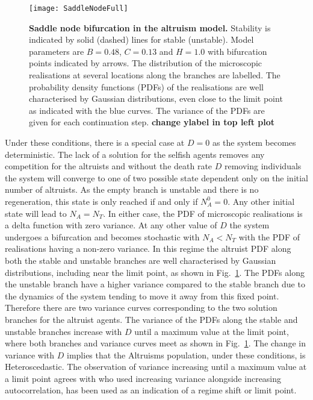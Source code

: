 \documentclass[11pt]{article}
\begin{document}
\begin{figure}[h]
	\centering
	\texttt{[image: SaddleNodeFull]}	
	\caption{{\bf Saddle node bifurcation in the altruism model.} Stability is 
	indicated by solid (dashed) lines for stable (unstable). Model parameters are $B=0.48$, $C=0.13$ and $H=1.0$ with bifurcation points indicated by arrows. The distribution of the microscopic realisations at several locations along the branches are labelled. The probability density functions (PDFs) of the realisations are well characterised by Gaussian distributions, even close to the limit point as indicated with the blue curves. The variance of the PDFs are given for each continuation step. {\bf change ylabel in top left plot}
	}
	\label{fig:SaddleNode}
\end{figure} 

Under these conditions, there is a special case at $D=0$ as the system becomes deterministic. The lack of a solution for the selfish agents removes any competition for the altruists and without the death rate $D$ removing individuals the system will converge to one of two possible state dependent only on the initial number of altruists. As the empty branch is unstable and there is no regeneration, this state is only reached if and only if $N^0_A=0$. Any other initial state will lead to $N_A=N_T$. In either case, the PDF of microscopic realisations is a delta function with zero variance. At any other value of $D$ the system undergoes a bifurcation and becomes stochastic with $N_A<N_T$ with the PDF of realisations having a non-zero variance. In this regime the altruist PDF along both the stable and unstable branches are well characterised by Gaussian distributions, including near the limit point, as shown in Fig.~\ref{fig:SaddleNode}. The PDFs along the unstable branch have a higher variance compared to the stable branch due to the dynamics of the system tending to move it away from this fixed point. Therefore there are two variance curves corresponding to the two solution branches for the altruist agents. The variance of the PDFs along the stable and unstable branches increase with $D$ until a maximum value at the limit point, where both branches and variance curves meet as shown in Fig.~\ref{fig:SaddleNode}. The change in variance with $D$ implies that the Altruisms population, under these conditions, is Heteroscedastic. The observation of variance increasing until a maximum value at a limit point agrees with \cite{Ditlevsen2010} who used increasing variance alongside increasing autocorrelation, has been used as an indication of a regime shift or limit point. 
\end{document}
